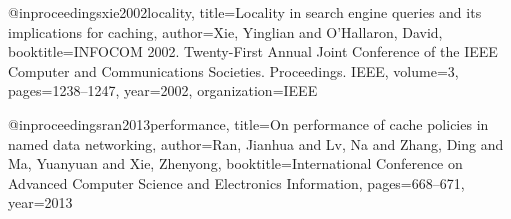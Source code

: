 @inproceedings{xie2002locality,
	title={Locality in search engine queries and its implications for caching},
	author={Xie, Yinglian and O'Hallaron, David},
	booktitle={INFOCOM 2002. Twenty-First Annual Joint Conference of the IEEE Computer and Communications Societies. Proceedings. IEEE},
	volume={3},
	pages={1238--1247},
	year={2002},
	organization={IEEE}
}

@inproceedings{ran2013performance,
	title={On performance of cache policies in named data networking},
	author={Ran, Jianhua and Lv, Na and Zhang, Ding and Ma, Yuanyuan and Xie, Zhenyong},
	booktitle={International Conference on Advanced Computer Science and Electronics Information},
	pages={668--671},
	year={2013}
}

